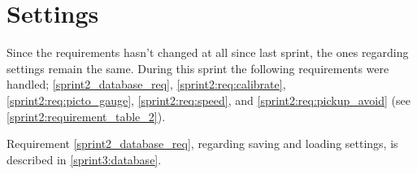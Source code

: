 \section{Settings}

Since the requirements hasn't changed at all since last sprint, the ones regarding settings remain the same.
During this sprint the following requirements were handled; \ref{sprint2_database_req}, \ref{sprint2:req:calibrate}, \ref{sprint2:req:picto_gauge}, \ref{sprint2:req:speed}, and \ref{sprint2:req:pickup_avoid} (see \cref{sprint2:requirement_table_2}).

Requirement \ref{sprint2_database_req}, regarding saving and loading settings, is described in \ref{sprint3:database}.